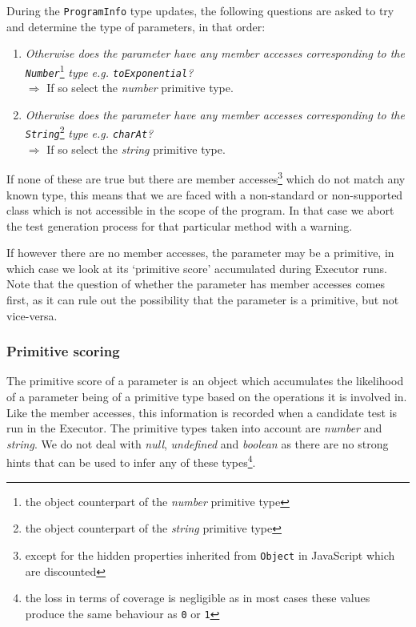 During the \texttt{ProgramInfo} type updates, the following questions are asked to try and determine the type of parameters, in that order:

\begin{enumerate}
   \begin{item}
      \emph{Does the parameter have any user-defined member accesses?}\\\(\Rightarrow\) If so select the highest match.
   \end{item}
   \item \emph{Otherwise does the parameter have any member accesses corresponding to the \texttt{\emph{Number}}}\footnote{the object counterpart of the \emph{number} primitive type} \emph{type e.g. \texttt{\emph{toExponential}}?}\\\(\Rightarrow\) If so select the \emph{number} primitive type.
   \item \emph{Otherwise does the parameter have any member accesses corresponding to the \texttt{\emph{String}}}\footnote{the object counterpart of the \emph{string} primitive type} \emph{type e.g. \texttt{\emph{charAt}}?}\\\(\Rightarrow\) If so select the \emph{string} primitive type.
\end{enumerate}

If none of these are true but there are member accesses\footnote{except for the hidden properties inherited from \texttt{Object} in JavaScript which are discounted} which do not match any known type, this means that we are faced with a non-standard or non-supported class which is not accessible in the scope of the program. In that case we abort the test generation process for that particular method with a warning.

If however there are no member accesses, the parameter may be a primitive, in which case we look at its `primitive score' accumulated during \textsf{Executor} runs. Note that the question of whether the parameter has member accesses comes first, as it can rule out the possibility that the parameter is a primitive, but not vice-versa.

\subsubsection{Primitive scoring}
The primitive score of a parameter is an object which accumulates the likelihood of a parameter being of a primitive type based on the operations it is involved in. Like the member accesses, this information is recorded when a candidate test is run in the \textsf{Executor}. The primitive types taken into account are \emph{number} and \emph{string}. We do not deal with \emph{null}, \emph{undefined} and \emph{boolean} as there are no strong hints that can be used to infer any of these types\footnote{the loss in terms of coverage is negligible as in most cases these values produce the same behaviour as \texttt{0} or \texttt{1}}.

